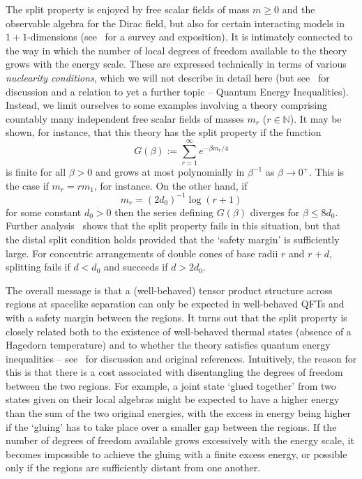 \documentclass[12pt]{article}
\newcommand{\1}{\mathds{1}}                         %
\newcommand{\NN}{\mathbb{N}}          %
\begin{document}
The split property is enjoyed by free scalar fields of mass $m\ge 0$ and the observable algebra for the Dirac field, but also for certain interacting models in $1+1$-dimensions (see~\cite{Lech_chap:2015} for a survey and exposition).
It is intimately connected to the way in which the number of local degrees of freedom available to the theory grows with the energy scale.
These are expressed technically in terms of various \emph{nuclearity conditions}, which we will not describe in detail here (but see~\cite{Fewster_Abh:2016} for discussion and a relation to yet a further topic -- Quantum Energy Inequalities). Instead, we limit ourselves to some examples involving a theory comprising countably many independent free scalar fields of masses $m_r$ ($r\in \NN$). It may be shown, for instance, that this theory has the split property if the function
\[
G(\beta):= \sum_{r=1}^\infty e^{-\beta m_r/4}
\]
is finite for all $\beta>0$ and grows at most polynomially in $\beta^{-1}$ as $\beta\to 0^+$. This is the case if $m_r=rm_1$, for instance. On the other hand, if 
\[
m_r = (2d_0)^{-1}\log(r+1)
\]
for some constant $d_0>0$ then the series defining $G(\beta)$ diverges for $\beta\le 8d_0$. 
Further analysis~\cite[Thm 4.3]{DAnDopFreLon:1987} shows that the split property fails in this situation, but that the distal split condition holds provided that the `safety margin' is sufficiently large. For concentric arrangements of double cones of base radii $r$ and $r+d$, splitting fails if $d<d_0$ and succeeds if $d>2d_0$. 

The overall message is that a (well-behaved) tensor product structure across regions at spacelike separation can only be expected in well-behaved QFTs and with a safety margin between the regions. It turns out that the split property is closely related both to the existence of well-behaved thermal states (absence of a Hagedorn temperature) and to whether the theory satisfies quantum energy inequalities -- see~\cite{Fewster_Abh:2016} for discussion and original references. Intuitively, the reason for this is that there is a cost associated with disentangling the degrees of freedom between the two regions. For example, a joint state `glued together' from two states given on their local algebras might be expected to have a higher energy than the sum of the two original energies, with the excess in energy being higher if the `gluing' has to take place over a smaller gap between the regions. If the number of degrees of freedom available grows excessively with the energy scale, it becomes impossible to achieve the gluing with a finite excess energy, or possible only if the regions are sufficiently distant from one another. 
 
\end{document}
